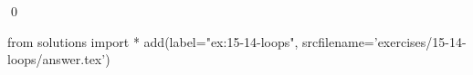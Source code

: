 
\begin{ex}
  \label{ex:15-14-loops}
  
  \qed
\end{ex}
\begin{python0}
from solutions import *
add(label="ex:15-14-loops",
    srcfilename='exercises/15-14-loops/answer.tex')
\end{python0}
